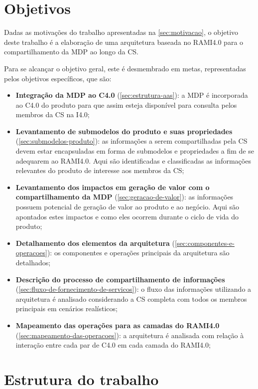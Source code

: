 \section{Objetivos}
\label{sec:objetivos}

Dadas as motivações do trabalho apresentadas na \autoref{sec:motivacao}, o objetivo deste trabalho é a elaboração de uma arquitetura baseada no RAMI4.0 para o compartilhamento da MDP ao longo da CS.

Para se alcançar o objetivo geral, este é desmembrado em metas, representadas pelos objetivos específicos, que são:

\begin{itemize}
	\item \textbf{Integração da MDP ao C4.0} (\autoref{sec:estrutura-aas}): a MDP é incorporada ao C4.0 do produto para que assim esteja disponível para consulta pelos membros da CS na I4.0;
	\item \textbf{Levantamento de submodelos do produto e suas propriedades} (\autoref{sec:submodelos-produto}): as informações a serem compartilhadas pela CS devem estar encapsuladas em forma de submodelos e propriedades a fim de se adequarem ao RAMI4.0. Aqui são identificadas e classificadas as informações relevantes do produto de interesse aos membros da CS;
	\item \textbf{Levantamento dos impactos em geração de valor com o compartilhamento da MDP} (\autoref{sec:geracao-de-valor}): as informações possuem potencial de geração de valor ao produto e ao negócio. Aqui são apontados estes impactos e como eles ocorrem durante o ciclo de vida do produto;
	\item \textbf{Detalhamento dos elementos da arquitetura} (\autoref{sec:componentes-e-operacoes}): os componentes e operações principais da arquitetura são detalhados;
	\item \textbf{Descrição do processo de compartilhamento de informações} (\autoref{sec:fluxo-de-fornecimento-de-servicos}): o fluxo das informações utilizando a arquitetura é analisado considerando a CS completa com todos os membros principais em cenários realísticos;
	\item \textbf{Mapeamento das operações para as camadas do RAMI4.0} (\autoref{sec:mapeamento-das-operacoes}): a arquitetura é analisada com relação à interação entre cada par de C4.0 em cada camada do RAMI4.0;
\end{itemize}

\section{Estrutura do trabalho}
\label{sec:estrutura}

